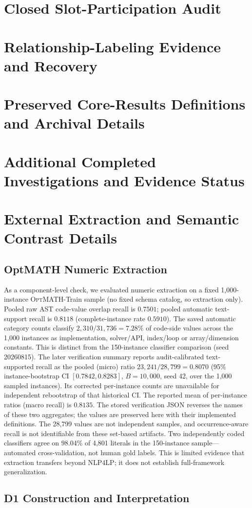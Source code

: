 \documentclass[pdflatex,sn-basic,Numbered]{sn-jnl}
\begin{document}
\section{Closed Slot-Participation Audit}
\label{app:g3}

\section{Relationship-Labeling Evidence and Recovery}


\section{Preserved Core-Results Definitions and Archival Details}

\section{Additional Completed Investigations and Evidence Status}
\label{app:additional-evidence}


\section{External Extraction and Semantic Contrast Details}
\subsection{OptMATH Numeric Extraction}
\label{app:extraction-details}
As a component-level check, we evaluated numeric extraction on a fixed 1,000-instance \textsc{OptMATH}-Train sample \cite{lu2025optmath} (no fixed schema catalog, so extraction only). Pooled raw AST code-value overlap recall is $0.7501$; pooled automatic text-support recall is $0.8118$ (complete-instance rate $0.5910$). The saved automatic category counts classify $2{,}310/31{,}736=7.28\%$ of code-side values across the 1,000 instances as implementation, solver/API, index/loop or array/dimension constants. This is distinct from the 150-instance classifier comparison (seed 20260815). The later verification summary reports audit-calibrated text-supported recall as the pooled (micro) ratio $23{,}241/28{,}799=0.8070$ (95\% instance-bootstrap CI $[0.7842,0.8283]$, $B=10{,}000$, seed 42, over the 1,000 sampled instances). Its corrected per-instance counts are unavailable for independent rebootstrap of that historical CI. The reported mean of per-instance ratios (macro recall) is $0.8135$. The stored verification JSON reverses the names of these two aggregates; the values are preserved here with their implemented definitions. The 28,799 values are not independent samples, and occurrence-aware recall is not identifiable from these set-based artifacts. Two independently coded classifiers agree on $98.04\%$ of 4,801 literals in the 150-instance sample---automated cross-validation, not human gold labels. This is limited evidence that extraction transfers beyond \textsc{NLP4LP}; it does not establish full-framework generalization.


\subsection{D1 Construction and Interpretation}
\label{app:d1-details}



\end{document}
